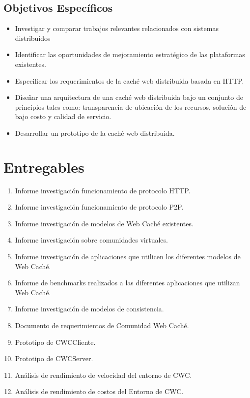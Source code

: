 \subsection{Objetivos Específicos}
\begin{itemize}
\item Investigar y comparar trabajos relevantes relacionados con sistemas distribuidos
\item Identificar las oportunidades de mejoramiento estratégico de las plataformas existentes.
\item Especificar los requerimientos de la caché web distribuida basada en HTTP.
\item Diseñar una arquitectura de una caché web distribuida bajo un conjunto de principios tales como: transparencia de ubicación de los recursos, solución de bajo costo y calidad de servicio.
\item Desarrollar un prototipo de la caché web distribuida.
\end{itemize}

\section{Entregables}
\begin{enumerate}
\item Informe investigación funcionamiento de protocolo HTTP.
\item Informe investigación funcionamiento de protocolo P2P.
\item Informe investigación de modelos de Web Caché existentes.
\item Informe investigación sobre comunidades virtuales.
\item Informe investigación de aplicaciones que utilicen los diferentes modelos de Web Caché.
\item Informe de benchmarks realizados a las diferentes aplicaciones que utilizan Web Caché.
\item Informe investigación de modelos de consistencia.
\item Documento de requerimientos de Comunidad Web Caché.
\item Prototipo de CWCCliente.
\item Prototipo de CWCServer.
\item Análisis de rendimiento de velocidad del entorno de CWC.
\item Análisis de rendimiento de costos del Entorno de CWC.
\end{enumerate}  

